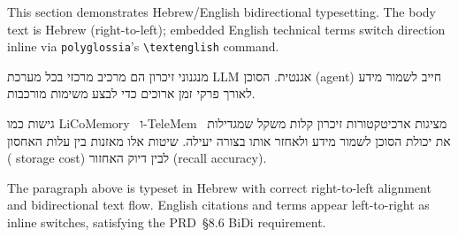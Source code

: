 This section demonstrates Hebrew/English bidirectional typesetting.
The body text is Hebrew (right-to-left); embedded English technical terms
switch direction inline via \texttt{polyglossia}'s \texttt{\textbackslash textenglish} command.

\medskip
\begin{hebrew}
מנגנוני זיכרון הם מרכיב מרכזי בכל מערכת \textenglish{LLM} אגנטית.
הסוכן (\textenglish{agent}) \texthebrew{חייב לשמור מידע}
לאורך פרקי זמן ארוכים כדי לבצע משימות מורכבות.

גישות כמו \textenglish{LiCoMemory}~\textenglish{\cite{huang2025licomemory}}
ו-\textenglish{TeleMem}~\textenglish{\cite{chen2025telemem}}
מציגות ארכיטקטורות זיכרון קלות משקל
שמגדילות את יכולת הסוכן לשמור מידע ולאחזר אותו בצורה יעילה.
שיטות אלו מאזנות בין עלות האחסון (%
\textenglish{storage cost}) לבין דיוק האחזור (\textenglish{recall accuracy}).
\end{hebrew}
\medskip

The paragraph above is typeset in Hebrew with correct right-to-left alignment
and bidirectional text flow.  English citations and terms appear left-to-right
as inline switches, satisfying the PRD~§8.6 BiDi requirement.
